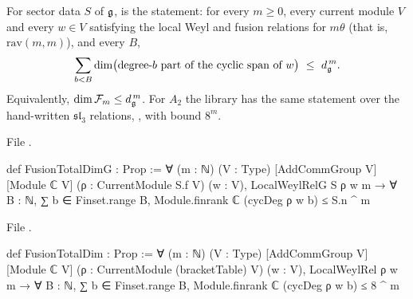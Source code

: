 \begin{definition}[Input T]\label{l27:def:totaldim}
For sector data $S$ of $\mathfrak g$,  is the statement: for every $m\ge0$, every current module $V$
and every $w\in V$ satisfying the local Weyl and fusion relations for $m\theta$ (that is, $\mathrm{rav}(m,m)$), and every $B$,
\begin{equation*}
\sum_{b<B}\dim\bigl(\text{degree-}b\text{ part of the cyclic span of }w\bigr)\ \le\ d_{\mathfrak g}^{\,m} .
\end{equation*}
Equivalently, $\dim\mathcal F_m\le d_{\mathfrak g}^{\,m}$. For $A_2$ the library has the same statement over the
hand-written $\mathfrak{sl}_3$ relations, , with bound $8^m$.
\end{definition}
\noindent File .
\begin{leancode}
def FusionTotalDimG : Prop :=
  ∀ (m : ℕ) (V : Type) [AddCommGroup V] [Module ℂ V] (ρ : CurrentModule S.f V) (w : V),
    LocalWeylRelG S ρ w m → ∀ B : ℕ, ∑ b ∈ Finset.range B, Module.finrank ℂ (cycDeg ρ w b) ≤ S.n ^ m
\end{leancode}
\noindent File .
\begin{leancode}
def FusionTotalDim : Prop :=
  ∀ (m : ℕ) (V : Type) [AddCommGroup V] [Module ℂ V] (ρ : CurrentModule (bracketTable) V) (w : V),
    LocalWeylRel ρ w m → ∀ B : ℕ, ∑ b ∈ Finset.range B, Module.finrank ℂ (cycDeg ρ w b) ≤ 8 ^ m
\end{leancode}

